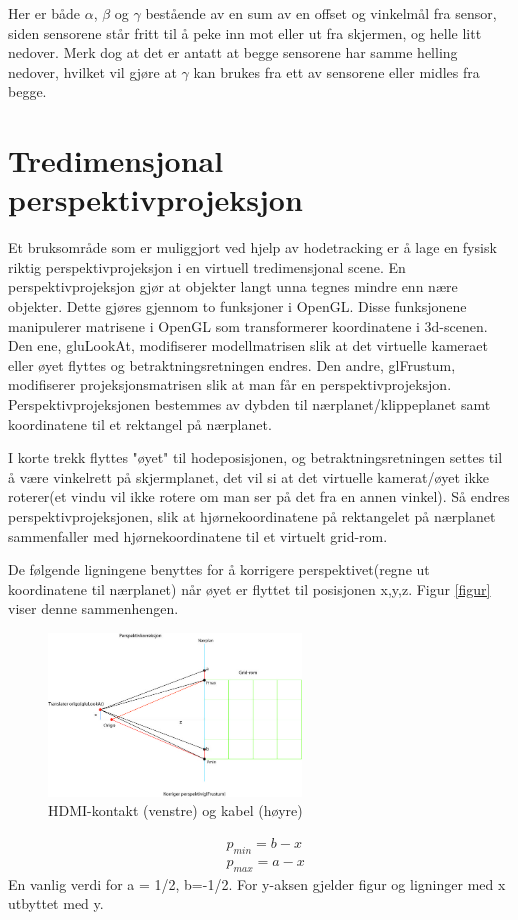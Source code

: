 \documentclass{report}
\begin{document}
Her er både $\alpha$, $\beta$ og $\gamma$ bestående av en sum av en offset og vinkelmål fra sensor, siden
sensorene står fritt til å peke inn mot eller ut fra skjermen, og helle litt nedover. Merk dog at 
det er antatt at begge sensorene har samme helling nedover, hvilket vil gjøre at $\gamma$ kan
brukes fra ett av sensorene eller midles fra begge.

\section{Tredimensjonal perspektivprojeksjon}
Et bruksområde som er muliggjort ved hjelp av hodetracking er å lage en fysisk riktig perspektivprojeksjon
i en virtuell tredimensjonal scene. En perspektivprojeksjon gjør at objekter langt unna tegnes
mindre enn nære objekter.
Dette gjøres gjennom to funksjoner i OpenGL. Disse funksjonene
manipulerer matrisene i OpenGL som transformerer koordinatene i 3d-scenen.
Den ene, gluLookAt, modifiserer modellmatrisen slik at det virtuelle kameraet eller øyet flyttes
og betraktningsretningen endres.  Den andre, glFrustum, modifiserer projeksjonsmatrisen slik at
man får en perspektivprojeksjon. Perspektivprojeksjonen bestemmes av dybden til nærplanet/klippeplanet
samt koordinatene til et rektangel på nærplanet.

I korte trekk flyttes "øyet" til hodeposisjonen, og betraktningsretningen settes til å være vinkelrett på
skjermplanet, det vil si at det virtuelle kamerat/øyet ikke roterer(et vindu vil ikke rotere om man ser på det fra en annen vinkel).
Så endres perspektivprojeksjonen, slik at hjørnekoordinatene på rektangelet på nærplanet sammenfaller med hjørnekoordinatene til
et virtuelt grid-rom. 

De følgende ligningene benyttes for å korrigere perspektivet(regne ut koordinatene til nærplanet) når øyet er flyttet til posisjonen x,y,z. Figur \ref{figur} viser denne sammenhengen.
	\begin{figure}[h]
	\centering
	\includegraphics[width=0.60\textwidth]{graphics/Perspektivkorreksjon.jpg}
	\caption{HDMI-kontakt (venstre) og kabel (høyre)}
	\label{fig:hdmi}
	\end{figure}
\begin{eqnarray}
&p_{min} = b-x\\
&p_{max} = a-x
\end{eqnarray}
En vanlig verdi for a = 1/2, b=-1/2.
For y-aksen gjelder figur og ligninger med x utbyttet med y.
\end{document}
